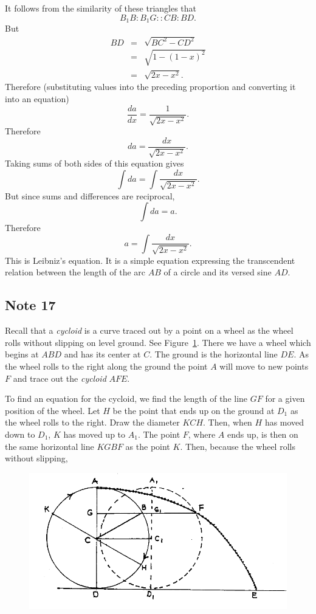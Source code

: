 \documentclass[twoside,openright]{article}
\begin{document}
It follows from the similarity of these triangles that
$$B_1B\!:\! B_1G :: CB\!:\!BD.$$
But
\begin{eqnarray*}
BD&  = & \sqrt{BC^2 - CD^2} \\
& = & \sqrt{1-(1-x)^2}\\
& = & \sqrt{2x -x^2}.\label{sinelength}
\end{eqnarray*}
Therefore (substituting values into the preceding proportion and converting it into an equation)
$$\frac{da}{dx} = \frac{1}{\sqrt{2x-x^2}}.$$ Therefore 
$$da = \frac{dx}{\sqrt{2x-x^2}}.$$
Taking sums of both sides of this equation gives
$$\int\! da =  \int\!\frac{dx}{\sqrt{2x-x^2}}.$$
But since sums and differences are reciprocal,
$$\int\! da = a.$$
Therefore
$$\label{ecircarc} a = \int\!\frac{dx}{\sqrt{2x-x^2}}.$$
This is Leibniz's equation.  It is a simple equation expressing the
transcendent relation between the length of the arc $AB$ of a circle
and its versed sine $AD$.

\subsection*{Note 17}
\label{crg17}

\label{cycloid} Recall that a {\em cycloid} is a curve traced out by a
point on a wheel as the wheel rolls without slipping on level ground.
See Figure~\ref{cyceqfig}.  There we have a wheel which begins at
$ABD$ and has its center at $C$.  The ground is the horizontal line
$DE$.  As the wheel rolls to the right along the ground the point $A$
will move to new points $F$ and trace out the {\em cycloid} $AFE$.

To find an equation for the cycloid, we find the length of the line
$GF$ for a given position of the wheel.  Let $H$ be the point that
ends up on the ground at $D_1$ as the wheel rolls to the right.  Draw
the diameter $KCH$.  Then, when $H$ has moved down to $D_1$, $K$ has
moved up to $A_1$. The point $F$, where $A$ ends up, is then on the
same horizontal line $KGBF$ as the point $K$.  Then, because the wheel
rolls without slipping,
\begin{figure}[htp]
\begin{center}
\includegraphics[width=\textwidth]{fig/Figure43}
\caption{}
\label{cyceqfig}
\vspace{-10pt}
\end{center}
\end{figure} 
\end{document}
